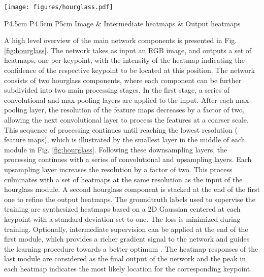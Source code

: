 \documentclass[letterpaper, 10 pt, conference]{ieeeconf}
\begin{document}
\begin{figure*}
  \centering
  \texttt{[image: figures/hourglass.pdf]}\\
  \vspace{-2em}
	  \begin{tabular}{P{4.5cm} P{4.5cm} P{5cm}} 
	  \scriptsize{Image} & \scriptsize{Intermediate heatmaps} & \scriptsize{Output heatmaps} \\ 
	  \end{tabular}
  \caption{Overview of the stacked hourglass architecture. Here, two hourglass modules are stacked together. The symmetric nature of the design allows for bottom-up processing (from high to low resolution) in the first half of the module, and top-down processing (from low to high resolution) in the second half. Intermediate supervision is applied after the first module. The heatmap responses of the second module represent the final output of the network that is used for keypoint localization.}\label{fig:hourglass}
\vspace{-1em}
\end{figure*}

\vspace{5pt}
A high level overview of the main network components is presented in Fig. \ref{fig:hourglass}. The network takes as input an RGB image, and outputs a set of heatmaps, one per keypoint, with the intensity of the heatmap indicating the confidence of the respective keypoint to be located at this position. The network consists of two hourglass components, where each component can be further subdivided into two main processing stages. In the first stage, a series of convolutional and max-pooling layers are applied to the input. After each max-pooling layer, the resolution of the feature maps decreases by a factor of two, allowing the next convolutional layer to process the features at a coarser scale. This sequence of processing continues until reaching the lowest resolution ( feature maps), which is illustrated by the smallest layer in the middle of each module in Fig. \ref{fig:hourglass}. Following these downsampling layers, the processing continues with a series of convolutional and upsampling layers. Each upsampling layer increases the resolution by a factor of two. This process culminates with a set of heatmaps at the same resolution as the input of the hourglass module. A second hourglass component is stacked at the end of the first one to refine the output heatmaps. The groundtruth labels used to supervise the training are synthesized heatmaps based on a 2D Gaussian centered at each keypoint with a standard deviation set to one. The  loss is minimized during training. Optionally, intermediate supervision can be applied at the end of the first module, which provides a richer gradient signal to the network and guides the learning procedure towards a better optimum \cite{lee2015deeply}. The heatmap responses of the last module are considered as the final output of the network and the peak in each heatmap indicates the most likely location for the corresponding keypoint. 
\end{document}
